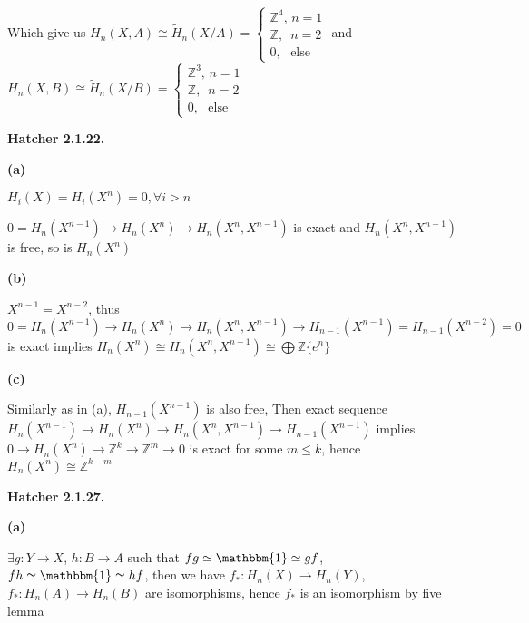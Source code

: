 \documentclass[../main.tex]{subfiles}
\begin{document}
\par
Which give us $H_n(X,A)\cong \tilde{H}_n(X/A)=
\begin{cases}
\mathbb{Z}^4,\,n=1\\
\mathbb{Z},\,\,\,n=2\\
0,\,\,\,\,\text{else}
\end{cases}$ and $H_n(X,B)\cong \tilde{H}_n(X/B)=
\begin{cases}
\mathbb{Z}^3,\,n=1\\
\mathbb{Z},\,\,\,n=2\\
0,\,\,\,\,\text{else}
\end{cases}$ \par
\textbf{Hatcher 2.1.22.} \par
\textbf{(a)} \par
$H_i(X)=H_i(X^n)=0,\forall i>n$ \par
$0=H_n(X^{n-1})\rightarrow H_n(X^n)\rightarrow H_n(X^n,X^{n-1})$ is exact and $H_n(X^n,X^{n-1})$ is free, so is $H_n(X^n)$ \par
\textbf{(b)} \par
$X^{n-1}=X^{n-2}$, thus $0=H_n(X^{n-1})\rightarrow H_n(X^n)\rightarrow H_n(X^n,X^{n-1})\rightarrow H_{n-1}(X^{n-1})=H_{n-1}(X^{n-2})=0$ is exact implies $H_n(X^n)\cong H_n(X^n,X^{n-1})\cong \bigoplus\mathbb{Z}\{e^n\}$ \par
\textbf{(c)} \par
Similarly as in (a), $H_{n-1}(X^{n-1})$ is also free, Then exact sequence $H_n(X^{n-1})\rightarrow H_n(X^n)\rightarrow H_n(X^n,X^{n-1})\rightarrow H_{n-1}(X^{n-1})$ implies $0\rightarrow H_n(X^n)\rightarrow \mathbb{Z}^k\rightarrow \mathbb{Z}^m\rightarrow 0$ is exact for some $m\leq k$, hence $H_n(X^n)\cong \mathbb{Z}^{k-m}$ \par
\textbf{Hatcher 2.1.27.} \par
\textbf{(a)} \par
$\exists g:Y\rightarrow X$, $h:B\rightarrow A$ such that $fg\simeq\mathbbm{1}\simeq gf$, $fh\simeq\mathbbm{1}\simeq hf$, then we have $f_*:H_n(X)\rightarrow H_n(Y)$, $f_*:H_n(A)\rightarrow H_n(B)$ are isomorphisms, hence $f_*$ is an isomorphism  by five lemma\par
\begin{center}
\end{center}
\end{document}
